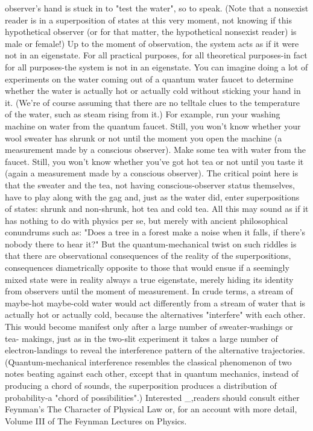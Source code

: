 observer's hand is stuck in to "test the water", so to speak. (Note that a nonsexist
reader is in a superposition of states at this very moment, not knowing if this
hypothetical observer (or for that matter, the hypothetical nonsexist reader) is male or
female!) Up to the moment of observation, the system acts as if it were not in an
eigenstate. For all practical purposes, for all theoretical purposes-in fact for all
purposes-the system is not in an eigenstate.
        You can imagine doing a lot of experiments on the water coming out of a
quantum water faucet to determine whether the water is actually hot or actually cold
without sticking your hand in it. (We're of course assuming that there are no telltale
clues to the temperature of the water, such as steam rising from it.) For example, run
your washing machine on water from the quantum faucet. Still, you won't know
whether your wool sweater has shrunk or not until the moment you open the machine
(a measurement made by a conscious observer). Make some tea with water from the
faucet. Still, you won't know whether you've got hot tea or not until you taste it (again
a measurement made by a conscious observer). The critical point here is that the
sweater and the tea, not having conscious-observer status themselves, have to play
along with the gag and, just as the water did, enter superpositions of states: shrunk
and non-shrunk, hot tea and cold tea.
        All this may sound as if it has nothing to do with physics per se, but merely
with ancient philosophical conundrums such as: "Does a tree in a forest make a noise
when it falls, if there's nobody there to hear it?" But the quantum-mechanical twist on
such riddles is that there are observational consequences of the reality of the
superpositions, consequences diametrically opposite to those that would ensue if a
seemingly mixed state were in reality always a true eigenstate, merely hiding its
identity from observers until the moment of measurement. In crude terms, a stream of
maybe-hot maybe-cold water would act differently from a stream of water that is
actually hot or actually cold, because the alternatives "interfere" with each other. This
would become manifest only after a large number of sweater-washings or tea-
makings, just as in the two-slit experiment it takes a large number of electron-landings
to reveal the interference pattern of the alternative trajectories. (Quantum-mechanical
interference resembles the classical phenomenon of two notes beating against each
other, except that in quantum mechanics, instead of producing a chord of sounds, the
superposition produces a distribution of probability-a "chord of possibilities".)
Interested \_,readers should consult either Feynman's The Character of Physical Law
or, for an account with more detail, Volume III of The Feynman Lectures on Physics.

